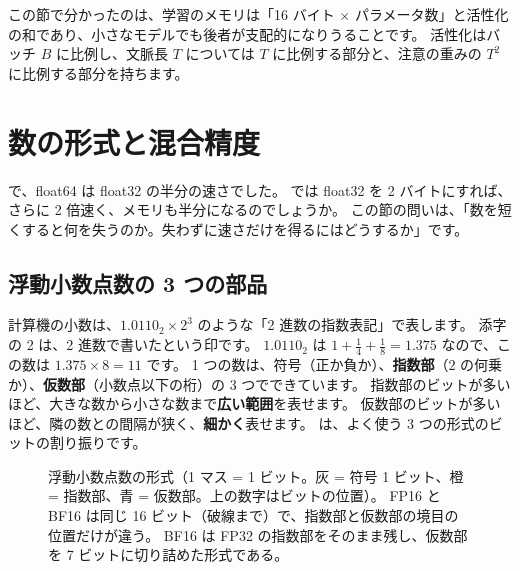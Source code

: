 この節で分かったのは、学習のメモリは「16 バイト $\times$ パラメータ数」と活性化の和であり、小さなモデルでも後者が支配的になりうることです。
活性化はバッチ $B$ に比例し、文脈長 $T$ については $T$ に比例する部分と、注意の重みの $T^2$ に比例する部分を持ちます。

\section{数の形式と混合精度}\label{sec:gpu-precision}

で、float64 は float32 の半分の速さでした。
では float32 を 2 バイトにすれば、さらに 2 倍速く、メモリも半分になるのでしょうか。
この節の問いは、「数を短くすると何を失うのか。失わずに速さだけを得るにはどうするか」です。

\subsection*{浮動小数点数の 3 つの部品}

計算機の小数は、$1.0110_2\times2^{3}$ のような「2 進数の指数表記」で表します。
添字の 2 は、2 進数で書いたという印です。
$1.0110_2$ は $1+\tfrac14+\tfrac18=1.375$ なので、この数は $1.375\times8=11$ です。
1 つの数は、符号（正か負か）、\textbf{指数部}（$2$ の何乗か）、\textbf{仮数部}（小数点以下の桁）の 3 つでできています。
指数部のビットが多いほど、大きな数から小さな数まで\textbf{広い範囲}を表せます。
仮数部のビットが多いほど、隣の数との間隔が狭く、\textbf{細かく}表せます。
は、よく使う 3 つの形式のビットの割り振りです。

\begin{figure}[!tbp]
\centering
{}
\caption{浮動小数点数の形式（1 マス = 1 ビット。灰 = 符号 1 ビット、橙 = 指数部、青 = 仮数部。上の数字はビットの位置）。
FP16 と BF16 は同じ 16 ビット（破線まで）で、指数部と仮数部の境目の位置だけが違う。
BF16 は FP32 の指数部をそのまま残し、仮数部を 7 ビットに切り詰めた形式である。}
\label{fig:gpu-float-formats}
\end{figure}

